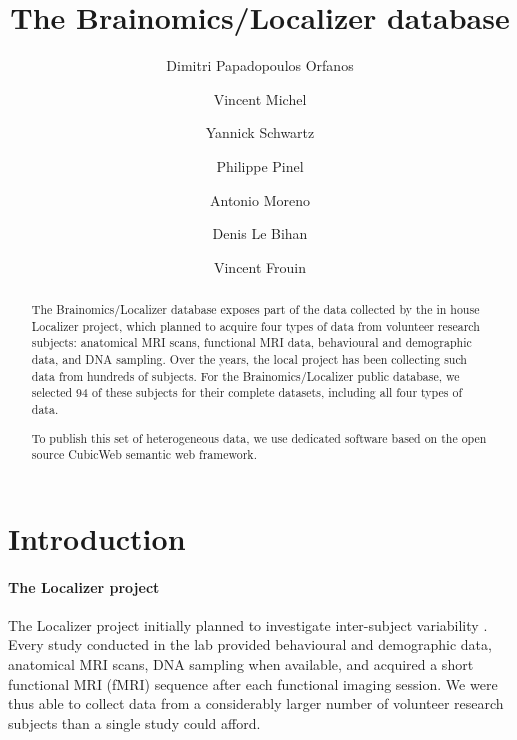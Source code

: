 \documentclass[review]{elsarticle}
\begin{document}
\begin{frontmatter}

\title{The Brainomics/Localizer database}

\author[Neurospin]{Dimitri Papadopoulos Orfanos}
\author[Logilab]{Vincent Michel}
\author[Parietal,Neurospin]{Yannick Schwartz}
\author[U992,Neurospin,ParisSud]{Philippe Pinel}
\author[U992,Neurospin,ParisSud]{Antonio Moreno}
\author[Neurospin]{Denis Le Bihan}
\author[Neurospin]{Vincent Frouin}

\address[Neurospin]{CEA, DSV/I2BM, NeuroSpin, 91191 Gif-sur-Yvette, France}
\address[U992]{INSERM, U992, Cognitive Neuroimaging Unit, 91191 Gif-sur-Yvette, France}
\address[Parietal]{Parietal team, Institut National de Recherche en Informatique et Automatique, Palaiseau, France}
\address[ParisSud]{Univ. Paris-Sud, Cognitive Neuroimaging Unit, 91191 Gif-sur-Yvette, France}
\address[Logilab]{Logilab, 104 boulevard Auguste Blanqui, 75013 Paris, France}

\begin{abstract}
The Brainomics/Localizer database exposes part of the data collected by
the in house Localizer project, which planned to acquire four types of
data from volunteer research subjects: anatomical MRI scans, functional MRI
data, behavioural and demographic data, and DNA sampling. Over the years, the
local project has been collecting such data from hundreds of subjects. For the
Brainomics/Localizer public database, we selected 94 of these subjects for their
complete datasets, including all four types of data.

To publish this set of heterogeneous data, we use dedicated software based on
the open source CubicWeb semantic web framework.
\end{abstract}

\end{frontmatter}


\section{Introduction}

\paragraph{The Localizer project} The Localizer project initially planned to investigate inter-subject variability \cite{Pinel2007}. Every study conducted in the lab provided behavioural and demographic data, anatomical MRI scans, DNA sampling when available, and acquired a short functional MRI (fMRI) sequence after each functional imaging session. We were thus able to collect data from a considerably larger number of volunteer research subjects than a single study could afford. 
\end{document}
